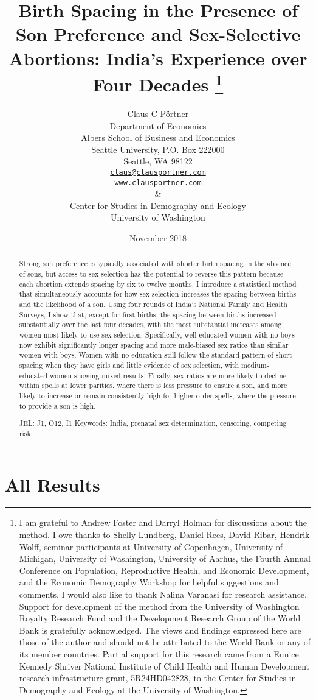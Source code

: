 \documentclass[12pt,letterpaper]{article}
\title{Birth Spacing in the Presence of Son Preference and Sex-Selective Abortions:
India's Experience over Four Decades%
\protect\thanks{%
I am grateful to Andrew Foster and Darryl Holman for discussions about the method.
I owe thanks to Shelly Lundberg, Daniel Rees, David Ribar, 
Hendrik Wolff, seminar participants at University of Copenhagen, University of Michigan, 
University of Washington, University of Aarhus, the Fourth 
Annual Conference on Population, Reproductive Health, 
and Economic Development, and the Economic Demography Workshop for helpful 
suggestions and comments.
I would also like to thank Nalina Varanasi for research assistance.
Support for development of the method from the University of Washington Royalty 
Research Fund and the Development Research Group of the World Bank is gratefully 
acknowledged.
The views and findings expressed here are those of the author and
should not be attributed to the World Bank or any of its member countries.
Partial support for this research came from a Eunice Kennedy Shriver National
Institute of Child Health and Human Development research infrastructure grant,
5R24HD042828, to the Center for Studies in Demography and Ecology at the
University of Washington.
}
}
\author{Claus C P\"ortner\\
    Department of Economics\\
    Albers School of Business and Economics\\
    Seattle University, P.O. Box 222000\\
    Seattle, WA 98122\\
    \href{mailto:claus@clausportner.com}{\texttt{claus@clausportner.com}}\\
    \href{http://www.clausportner.com}{\texttt{www.clausportner.com}}\\
    \& \\
    Center for Studies in Demography and Ecology \\
    University of Washington\\ \vspace{2cm}
    }
\date{November 2018}
\begin{document}
\graphicspath{{../figures/}}

\setcounter{page}{-1}
\maketitle
\thispagestyle{empty}



\newpage
\thispagestyle{empty}
\doublespacing

\begin{abstract}

\noindent 

Strong son preference is typically associated with shorter birth spacing
in the absence of sons, but access to sex selection has the potential to
reverse this pattern because each abortion extends spacing by six to
twelve months. 
I introduce a statistical method that simultaneously
accounts for how sex selection increases the spacing between 
births and the likelihood of a son. 
Using four rounds of India's National
Family and Health Surveys, I show that, except for first births,
the spacing between births increased substantially over the last four
decades, with the most substantial increases among women most 
likely to use sex selection.
Specifically, well-educated women with no boys now
exhibit significantly longer spacing and more male-biased sex ratios
than similar women with boys. 
Women with no education still follow the standard
pattern of short spacing when they have girls and little evidence of sex
selection, with medium-educated women showing mixed results. 
Finally,
sex ratios are more likely to decline within spells at lower parities,
where there is less pressure to ensure a son, and more likely to
increase or remain consistently high for higher-order spells, where the
pressure to provide a son is high.


\noindent JEL: J1, O12, I1
\noindent Keywords: India, prenatal sex determination, censoring, competing risk
\end{abstract}

\section{All Results}




\end{document}
